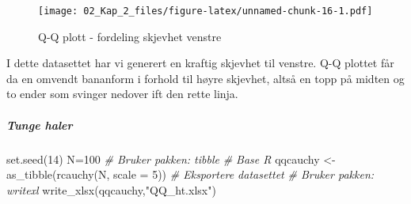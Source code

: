 \documentclass[
]{article}
\newenvironment{Shaded}{\begin{snugshade}}{\end{snugshade}}
\newcommand{\AttributeTok}[1]{\textcolor[rgb]{0.77,0.63,0.00}{#1}}
\newcommand{\CommentTok}[1]{\textcolor[rgb]{0.56,0.35,0.01}{\textit{#1}}}
\newcommand{\DecValTok}[1]{\textcolor[rgb]{0.00,0.00,0.81}{#1}}
\newcommand{\FunctionTok}[1]{\textcolor[rgb]{0.00,0.00,0.00}{#1}}
\newcommand{\NormalTok}[1]{#1}
\newcommand{\OtherTok}[1]{\textcolor[rgb]{0.56,0.35,0.01}{#1}}
\newcommand{\SpecialCharTok}[1]{\textcolor[rgb]{0.00,0.00,0.00}{#1}}
\newcommand{\StringTok}[1]{\textcolor[rgb]{0.31,0.60,0.02}{#1}}
\begin{document}
\begin{figure}
\centering
\texttt{[image: 02\_Kap\_2\_files/figure-latex/unnamed-chunk-16-1.pdf]}
\caption{\label{fig:unnamed-chunk-16}Q-Q plott - fordeling skjevhet venstre}
\end{figure}

I dette datasettet har vi generert en kraftig skjevhet til venstre. Q-Q plottet får da en omvendt bananform i forhold til høyre skjevhet, altså en topp på midten og to ender som svinger nedover ift den rette linja.

\hypertarget{tunge-haler}{%
\subparagraph{Tunge haler}\label{tunge-haler}}

\begin{Shaded}
\begin{Highlighting}[]
\FunctionTok{set.seed}\NormalTok{(}\DecValTok{14}\NormalTok{)}
\NormalTok{N}\OtherTok{=}\DecValTok{100}
\CommentTok{\# Bruker pakken: tibble}
\CommentTok{\# Base R}
\NormalTok{qqcauchy }\OtherTok{\textless{}{-}} \FunctionTok{as\_tibble}\NormalTok{(}\FunctionTok{rcauchy}\NormalTok{(N, }\AttributeTok{scale =} \DecValTok{5}\NormalTok{)) }
\CommentTok{\# Eksportere datasettet}
\CommentTok{\# Bruker pakken: writexl}
\FunctionTok{write\_xlsx}\NormalTok{(qqcauchy,}\StringTok{"QQ\_ht.xlsx"}\NormalTok{)}
\end{Highlighting}
\end{Shaded}

\begin{Shaded}
\end{Shaded}
\end{document}
